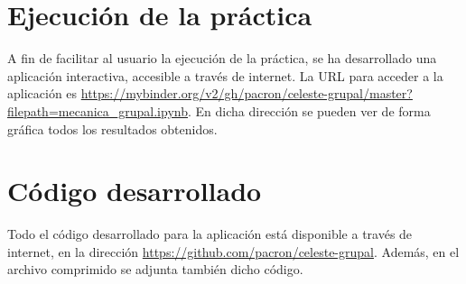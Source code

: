 \documentclass[12pt]{article}
\begin{document}
\section{Ejecución de la práctica}

A fin de facilitar al usuario la ejecución de la práctica, se ha desarrollado
una aplicación interactiva, accesible a través de internet. La URL para
acceder a la aplicación es 
\url{https://mybinder.org/v2/gh/pacron/celeste-grupal/master?filepath=mecanica_grupal.ipynb}.
En dicha dirección se pueden ver de forma gráfica todos los resultados 
obtenidos.

\section{Código desarrollado}

Todo el código desarrollado para la aplicación está disponible a través
de internet, en la dirección \url{https://github.com/pacron/celeste-grupal}.
Además, en el archivo comprimido se adjunta también dicho código.
\end{document}
